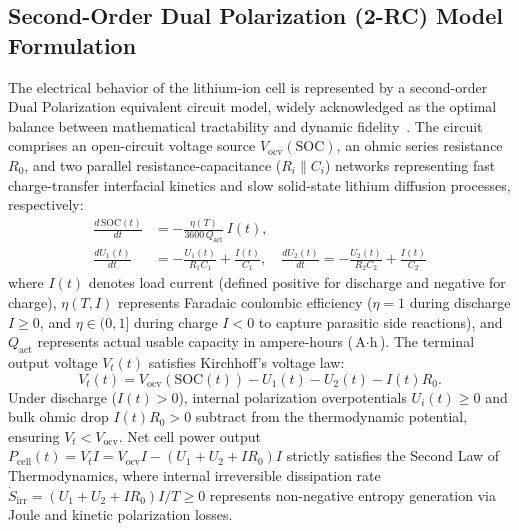 \documentclass[balance,nocopyright,upint,varvw,hyphenate,barcolor=NavyBlue,nolists]{asmejour}
\begin{document}
\subsection{Second-Order Dual Polarization (2-RC) Model Formulation}
The electrical behavior of the lithium-ion cell is represented by a second-order Dual Polarization equivalent circuit model, widely acknowledged as the optimal balance between mathematical tractability and dynamic fidelity~\cite{Hu2012ecm,Xiong2014}. The circuit comprises an open-circuit voltage source $V_{\text{ocv}}(\text{SOC})$, an ohmic series resistance $R_0$, and two parallel resistance-capacitance ($R_i \parallel C_i$) networks representing fast charge-transfer interfacial kinetics and slow solid-state lithium diffusion processes, respectively:
\begin{align}
\frac{d\,\text{SOC}(t)}{dt} &= -\frac{\eta(T)}{3600\,Q_{\text{act}}}\,I(t), \label{eqn:soc_diff}\\
\frac{d U_1(t)}{dt} &= -\frac{U_1(t)}{R_1 C_1} + \frac{I(t)}{C_1}, \quad \frac{d U_2(t)}{dt} = -\frac{U_2(t)}{R_2 C_2} + \frac{I(t)}{C_2} \label{eqn:u12_diff}
\end{align}
where $I(t)$ denotes load current (defined positive for discharge and negative for charge), $\eta(T, I)$ represents Faradaic coulombic efficiency ($\eta = 1$ during discharge $I \ge 0$, and $\eta \in (0, 1]$ during charge $I < 0$ to capture parasitic side reactions), and $Q_{\text{act}}$ represents actual usable capacity in ampere-hours ($\text{A}\cdot\text{h}$). The terminal output voltage $V_t(t)$ satisfies Kirchhoff's voltage law:
\begin{equation}\label{eqn:vt_diff}
V_t(t) = V_{\text{ocv}}(\text{SOC}(t)) - U_1(t) - U_2(t) - I(t) R_0.
\end{equation}
Under discharge ($I(t) > 0$), internal polarization overpotentials $U_i(t) \ge 0$ and bulk ohmic drop $I(t) R_0 > 0$ subtract from the thermodynamic potential, ensuring $V_t < V_{\text{ocv}}$. Net cell power output $P_{\text{cell}}(t) = V_t I = V_{\text{ocv}} I - (U_1 + U_2 + I R_0) I$ strictly satisfies the Second Law of Thermodynamics, where internal irreversible dissipation rate $\dot{S}_{\text{irr}} = (U_1 + U_2 + I R_0) I / T \ge 0$ represents non-negative entropy generation via Joule and kinetic polarization losses.
\end{document}
